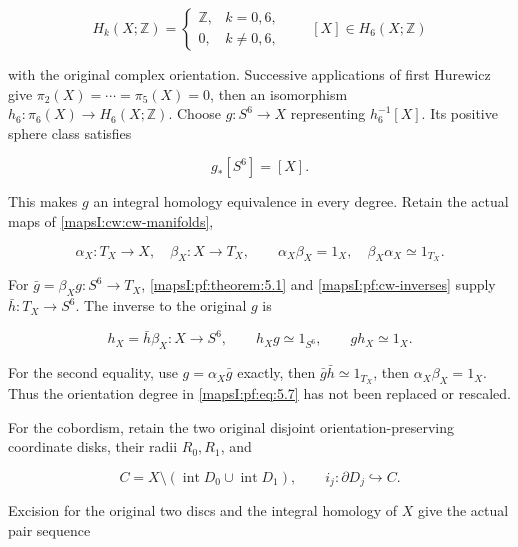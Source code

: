 \documentclass[11pt]{article}
\begin{document}
\begin{equation}
H_k(X;\mathbb Z)=
\begin{cases}\mathbb Z,&k=0,6,\\0,&k\ne0,6,\end{cases}
\qquad [X]\in H_6(X;\mathbb Z)
\label{mapsI:pf:eq:5.6}
\end{equation}

with the original complex orientation. Successive applications of first Hurewicz give \(\pi_2(X)=\cdots=\pi_5(X)=0\), then an isomorphism \(h_6:\pi_6(X)\to H_6(X;\mathbb Z)\). Choose \(g:S^6\to X\) representing \(h_6^{-1}[X]\). Its positive sphere class satisfies

\begin{equation}
g_*[S^6]=[X].
\label{mapsI:pf:eq:5.7}
\end{equation}

This makes \(g\) an integral homology equivalence in every degree. Retain the actual maps of \cref{mapsI:cw:cw-manifolds},

\begin{equation}
\alpha_X:T_X\to X,\quad\beta_X:X\to T_X,\qquad
\alpha_X\beta_X=1_X,\quad\beta_X\alpha_X\simeq1_{T_X}.
\label{mapsI:pf:eq:5.8}
\end{equation}

For \(\bar g=\beta_Xg:S^6\to T_X\), \cref{mapsI:pf:theorem:5.1} and \cref{mapsI:pf:cw-inverses} supply \(\bar h:T_X\to S^6\). The inverse to the original \(g\) is

\begin{equation}
h_X=\bar h\beta_X:X\to S^6,\qquad
h_Xg\simeq1_{S^6},\qquad gh_X\simeq1_X.
\label{mapsI:pf:eq:5.9}
\end{equation}

For the second equality, use \(g=\alpha_X\bar g\) exactly, then \(\bar g\bar h\simeq1_{T_X}\), then \(\alpha_X\beta_X=1_X\). Thus the orientation degree in \eqref{mapsI:pf:eq:5.7} has not been replaced or rescaled.

For the cobordism, retain the two original disjoint orientation-preserving coordinate disks, their radii \(R_0,R_1\), and

\begin{equation}
C=X\setminus(\operatorname{int}D_0\cup\operatorname{int}D_1),
\qquad i_j:\partial D_j\hookrightarrow C.
\label{mapsI:pf:eq:5.10}
\end{equation}

Excision for the original two discs and the integral homology of \(X\) give the actual pair sequence
\end{document}
